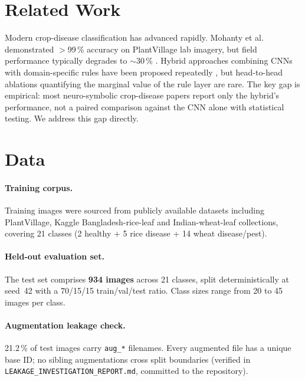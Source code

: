 \documentclass[runningheads]{llncs}
\begin{document}
\section{Related Work}

Modern crop-disease classification has advanced rapidly. Mohanty et
al.~\cite{Mohanty2016} demonstrated $>$99\,\% accuracy on PlantVillage lab
imagery, but field performance typically degrades to $\sim$30\,\%
\cite{Barbedo2018}. Hybrid approaches combining CNNs with domain-specific
rules have been proposed repeatedly \cite{Ferentinos2018,Ramcharan2017}, but
head-to-head ablations quantifying the marginal value of the rule layer are
rare. The key gap is empirical: most neuro-symbolic crop-disease papers
report only the hybrid's performance, not a paired comparison against the CNN
alone with statistical testing. We address this gap directly.

\section{Data}

\paragraph{Training corpus.}
Training images were sourced from publicly available datasets including
PlantVillage, Kaggle Bangladesh-rice-leaf and Indian-wheat-leaf collections,
covering 21 classes (2 healthy + 5 rice disease + 14 wheat disease/pest).

\paragraph{Held-out evaluation set.}
The test set comprises \textbf{934 images} across 21 classes, split
deterministically at seed~42 with a 70/15/15 train/val/test ratio. Class
sizes range from 20 to 45 images per class.

\paragraph{Augmentation leakage check.}
21.2\,\% of test images carry \texttt{aug\_*} filenames. Every augmented
file has a unique base ID; no sibling augmentations cross split boundaries
(verified in \texttt{LEAKAGE\_INVESTIGATION\_REPORT.md}, committed to the
repository).
\end{document}
